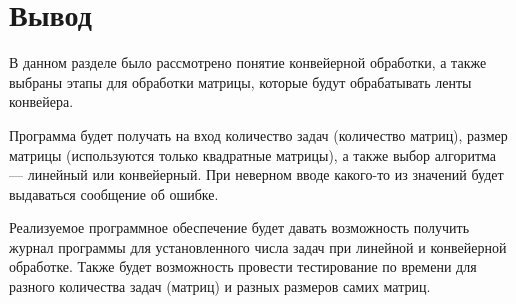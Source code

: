 \section*{Вывод}
В данном разделе было рассмотрено понятие конвейерной обработки, а также выбраны этапы для обработки матрицы, которые будут обрабатывать ленты конвейера.

Программа будет получать на вход количество задач (количество матриц), размер матрицы (используются только квадратные матрицы), а также выбор алгоритма --- линейный или конвейерный. При неверном вводе какого-то из значений будет выдаваться сообщение об ошибке.

Реализуемое программное обеспечение будет давать возможность получить журнал программы для установленного числа задач при линейной и конвейерной обработке. 
Также будет возможность провести тестирование по времени для разного количества задач (матриц) и разных размеров самих матриц.
